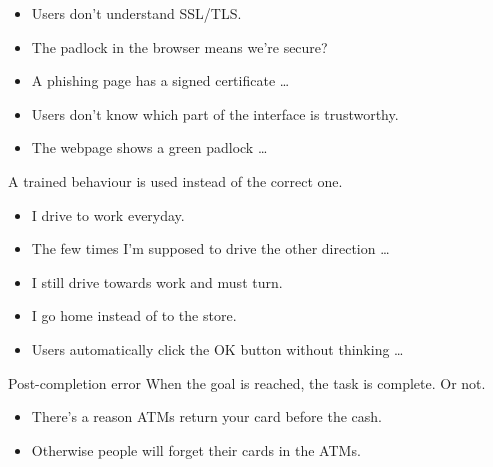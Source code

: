 \begin{frame}
  \begin{example}
    \begin{itemize}
      \item Users don't understand SSL/TLS\@.
      \item The padlock in the browser means we're secure?
      \item A phishing page has a signed certificate \dots
    \end{itemize}
  \end{example}

  \pause

  \begin{example}
    \begin{itemize}
      \item Users don't know which part of the interface is trustworthy.
      \item The webpage shows a green padlock \dots
    \end{itemize}
  \end{example}
\end{frame}

\begin{frame}
  \begin{definition}
    A trained behaviour is used instead of the correct one.
  \end{definition}

  \pause

  \begin{example}
    \begin{itemize}
      \item I drive to work everyday.
      \item The few times I'm supposed to drive the other direction \dots
      \item I still drive towards work and must turn.
      \item I go home instead of to the store.
      \item Users automatically click the OK button without thinking \dots
    \end{itemize}
  \end{example}
\end{frame}

\begin{frame}
  \begin{block}{Post-completion error}
    When the goal is reached, the task is complete.
    Or not.
  \end{block}

  \pause

  \begin{example}
    \begin{itemize}
      \item There's a reason ATMs return your card before the cash.
      \item Otherwise people will forget their cards in the ATMs.
    \end{itemize}
  \end{example}
\end{frame}

